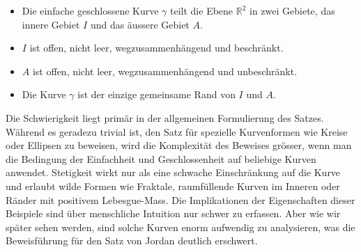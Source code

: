 \begin{itemize}
    \item Die einfache geschlossene Kurve $\gamma$ teilt die Ebene $\mathbb{R}^2$ in zwei Gebiete, das innere Gebiet $I$ und das äussere Gebiet $A$.
    \item $I$ ist offen, nicht leer, wegzusammenhängend und beschränkt.
    \item $A$ ist offen, nicht leer, wegzusammenhängend und unbeschränkt.
    \item Die Kurve $\gamma$ ist der einzige gemeinsame Rand von $I$ und $A$.
\end{itemize}

Die Schwierigkeit liegt primär in der allgemeinen Formulierung des Satzes.
Während es geradezu trivial ist, den Satz für spezielle Kurvenformen wie Kreise oder Ellipsen zu beweisen, wird die Komplexität des Beweises grösser, wenn man die Bedingung der Einfachheit und Geschlossenheit auf beliebige Kurven anwendet.
Stetigkeit wirkt nur als eine schwache Einschränkung auf die Kurve und erlaubt wilde Formen wie Fraktale, raumfüllende Kurven im Inneren oder Ränder mit positivem Lebesgue-Mass.
Die Implikationen der Eigenschaften dieser Beispiele sind über menschliche Intuition nur schwer zu erfassen.
Aber wie wir später sehen werden, sind solche Kurven enorm aufwendig zu analysieren, was die Beweisführung für den Satz von Jordan deutlich erschwert. 
